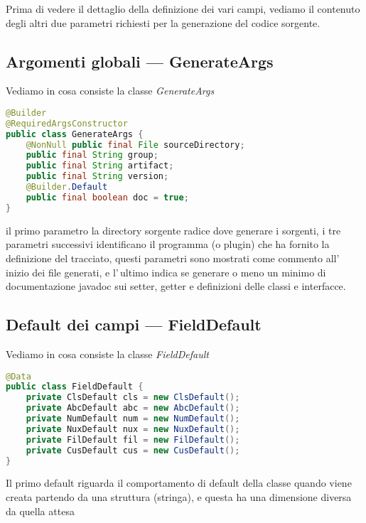 \documentclass[a4paper,10pt]{report}
\begin{document}
Prima di vedere il dettaglio della definizione dei vari campi, vediamo il 
contenuto degli altri due parametri richiesti per la generazione del codice
sorgente.

\subsection{Argomenti globali --- GenerateArgs}
Vediamo in cosa consiste la classe \textsl{GenerateArgs}

\begin{lstlisting}[language=java, caption=interfaccia GenerateArgs, 
label=code:GenerateArgs]
@Builder
@RequiredArgsConstructor
public class GenerateArgs {
    @NonNull public final File sourceDirectory;
    public final String group;
    public final String artifact;
    public final String version;
    @Builder.Default
    public final boolean doc = true;
}
\end{lstlisting}
il primo parametro la directory sorgente radice dove generare i sorgenti,
i tre parametri successivi identificano il programma (o plugin) che ha fornito
la definizione del tracciato, questi parametri sono mostrati come commento
all'\,inizio dei file generati, e l'\,ultimo indica se generare o meno un minimo
di documentazione javadoc sui setter, getter e definizioni delle classi e 
interfacce.

\subsection{Default dei campi --- FieldDefault}
Vediamo in cosa consiste la classe \textsl{FieldDefault}

\begin{lstlisting}[language=java, caption=class FieldDefault, 
label=code:FieldDefault]
@Data
public class FieldDefault {
    private ClsDefault cls = new ClsDefault();
    private AbcDefault abc = new AbcDefault();
    private NumDefault num = new NumDefault();
    private NuxDefault nux = new NuxDefault();
    private FilDefault fil = new FilDefault();
    private CusDefault cus = new CusDefault();
}
\end{lstlisting}
Il primo default riguarda il comportamento di default della classe quando viene 
creata partendo da una struttura (stringa), e questa ha una dimensione diversa 
da quella attesa
\end{document}
